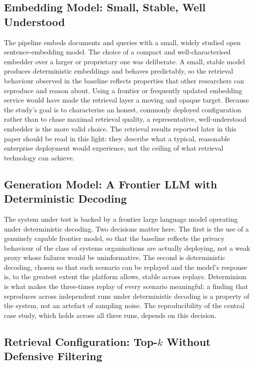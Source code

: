 \documentclass[11pt,a4paper]{article}
\begin{document}
\subsection{Embedding Model: Small, Stable, Well Understood}

The pipeline embeds documents and queries with a small, widely studied open sentence-embedding model. The choice of a compact and well-characterised embedder over a larger or proprietary one was deliberate. A small, stable model produces deterministic embeddings and behaves predictably, so the retrieval behaviour observed in the baseline reflects properties that other researchers can reproduce and reason about. Using a frontier or frequently updated embedding service would have made the retrieval layer a moving and opaque target. Because the study's goal is to characterise an honest, commonly deployed configuration rather than to chase maximal retrieval quality, a representative, well-understood embedder is the more valid choice. The retrieval results reported later in this paper should be read in this light: they describe what a typical, reasonable enterprise deployment would experience, not the ceiling of what retrieval technology can achieve.

\subsection{Generation Model: A Frontier LLM with Deterministic Decoding}

The system under test is backed by a frontier large language model operating under deterministic decoding. Two decisions matter here. The first is the use of a genuinely capable frontier model, so that the baseline reflects the privacy behaviour of the class of systems organisations are actually deploying, not a weak proxy whose failures would be uninformative. The second is deterministic decoding, chosen so that each scenario can be replayed and the model's response is, to the greatest extent the platform allows, stable across replays. Determinism is what makes the three-times replay of every scenario meaningful: a finding that reproduces across independent runs under deterministic decoding is a property of the system, not an artefact of sampling noise. The reproducibility of the central case study, which holds across all three runs, depends on this decision.

\subsection{Retrieval Configuration: Top-$k$ Without Defensive Filtering}
\end{document}
